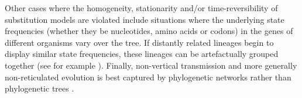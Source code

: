Other cases where the homogeneity, stationarity and/or time-reversibility of substitution models are violated include situations where the underlying state frequencies (whether they be nucleotides, amino acids or codons) in the genes of different organisms vary over the tree. If distantly related lineages begin to display similar state frequencies, these lineages can be artefactually grouped together (see for example \cite{foster2004modeling,jermiin2004biasing}). Finally, non-vertical transmission and more generally non-reticulated evolution is best captured by phylogenetic networks rather than phylogenetic trees \citep{huson2005application}. 


